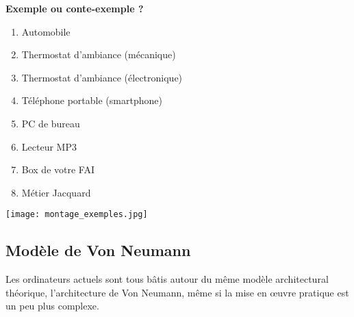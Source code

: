 \begin{exemple}
\textbf{Exemple ou conte-exemple ?}

\begin{minipage}{0.4\textwidth}
\begin{enumerate}
\item Automobile
\item Thermostat d'ambiance (mécanique)
\item Thermostat d'ambiance (électronique)
\item Téléphone portable (smartphone)
\item PC de bureau
\item Lecteur MP3
\item Box de votre FAI
\item Métier Jacquard
\end{enumerate}

\end{minipage}
\begin{minipage}{0.5\textwidth}
\begin{center}
\texttt{[image: montage\_exemples.jpg]}
\end{center}
\end{minipage}
\end{exemple}







\subsection{Modèle de Von Neumann}

Les ordinateurs actuels sont tous bâtis
autour du même modèle architectural théorique, l’architecture de Von Neumann, même
si la mise en œuvre pratique est un peu plus complexe.

